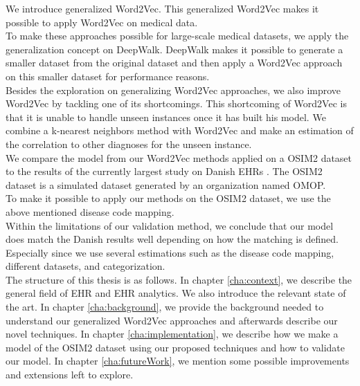 We introduce generalized Word2Vec. This generalized Word2Vec makes it possible to apply Word2Vec on medical data. \\
To make these approaches possible for large-scale medical datasets, we apply the generalization concept on DeepWalk. DeepWalk makes it possible to generate a smaller dataset from the original dataset and then apply a Word2Vec approach on this smaller dataset for performance reasons. \\
Besides the exploration on generalizing Word2Vec approaches, we also improve Word2Vec by tackling one of its shortcomings. This shortcoming of Word2Vec is that it is unable to handle unseen instances once it has built his model. We combine a k-nearest neighbors method with Word2Vec and make an estimation of the correlation to other diagnoses for the unseen instance. \\

We compare the model from our Word2Vec methods applied on a OSIM2 dataset to the results of the currently largest study on Danish EHRs \cite{Brunak:article}. The OSIM2 dataset is a simulated dataset generated by an organization named OMOP. \\
To make it possible to apply our methods on the OSIM2 dataset, we use the above mentioned disease code mapping. \\

Within the limitations of our validation method, we conclude that our model does match the Danish results well depending on how the matching is defined. Especially since we use several estimations such as the disease code mapping, different datasets, and categorization. \\

The structure of this thesis is as follows. In chapter \ref{cha:context}, we describe the general field of EHR and EHR analytics. We also introduce the relevant state of the art. In chapter \ref{cha:background}, we provide the background needed to understand our generalized Word2Vec approaches and afterwards describe our novel techniques. In chapter \ref{cha:implementation}, we describe how we make a model of the OSIM2 dataset using our proposed techniques and how to validate our model. In chapter \ref{cha:futureWork}, we mention some possible improvements and extensions left to explore.

